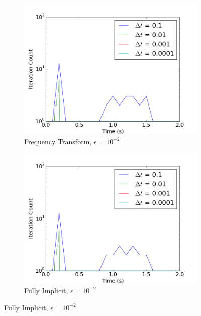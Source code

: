 \documentclass[12pt]{report}
\begin{document}
		\begin{figure}[ht]
			\centering
			\begin{subfigure}{.5\textwidth}
				\centering
				\includegraphics[width=.95\linewidth]{figs/iter_case2_conv1.png}
				\caption{Frequency Transform, $\epsilon = 10^{-2}$}
				\label{fig::iter_2_1_ft}
			\end{subfigure}%
			\begin{subfigure}{.5\textwidth}
				\centering
				\includegraphics[width=.95\linewidth]{figs/iter_case2_conv1_omega0.png}
				\caption{Fully Implicit, $\epsilon = 10^{-2}$}
				\label{fig::iter_2_1_fi}
			\end{subfigure}
			

\end{figure}
\end{document}
